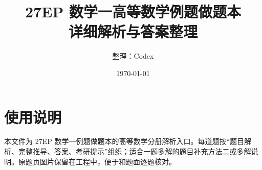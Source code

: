 \documentclass[UTF8,12pt,a4paper]{ctexbook}
\title{27EP 数学一高等数学例题做题本\\详细解析与答案整理}
\author{整理：Codex}
\date{\today}
\begin{document}
\maketitle
\tableofcontents

\chapter*{使用说明}
本文件为 27EP 数学一例题做题本的高等数学分册解析入口。每道题按“题目解析、完整推导、答案、考研提示”组织；适合一题多解的题目补充方法二或多解说明。原题页图片保留在工程中，便于和题面逐题核对。


















\end{document}
